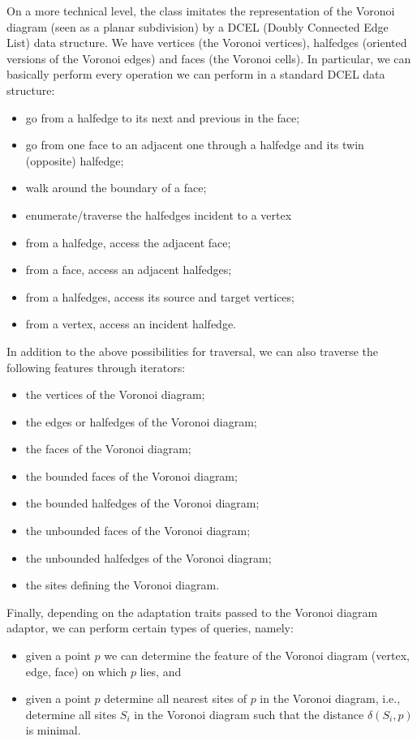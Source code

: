 On a more technical level, the 
class imitates the representation of the Voronoi diagram (seen as a
planar subdivision) by a DCEL (Doubly Connected Edge List) data
structure. We have vertices (the Voronoi vertices), halfedges
(oriented versions of the Voronoi edges) and faces (the Voronoi
cells). In particular, we can basically perform every operation we can
perform in a standard DCEL data structure:
\begin{itemize}
\item go from a halfedge to its next and previous in the face;
\item go from one face to an adjacent one through a halfedge and its
  twin (opposite) halfedge;
\item walk around the boundary of a face;
\item enumerate/traverse the halfedges incident to a vertex
\item from a halfedge, access the adjacent face;
\item from a face, access an adjacent halfedges;
\item from a halfedges, access its source and target vertices;
\item from a vertex, access an incident halfedge.
\end{itemize}
In addition to the above possibilities for traversal, we can also
traverse the following features through iterators:
\begin{itemize}
\item the vertices of the Voronoi diagram;
\item the edges or halfedges of the Voronoi diagram;
\item the faces of the Voronoi diagram;
\item the bounded faces of the Voronoi diagram;
\item the bounded halfedges of the Voronoi diagram;
\item the unbounded faces of the Voronoi diagram;
\item the unbounded halfedges of the Voronoi diagram;
\item the sites defining the Voronoi diagram.
\end{itemize}

Finally, depending on the adaptation traits passed to the Voronoi diagram
adaptor, we can perform certain types of queries, namely:
\begin{itemize}
\item given a point $p$ we can determine the feature of the Voronoi
  diagram (vertex, edge, face) on which $p$ lies, and
\item given a point $p$ determine all nearest sites of $p$ in the
  Voronoi diagram, i.e., determine all sites $S_i$ in the Voronoi
  diagram such that the distance $\delta(S_i,p)$ is minimal.
\end{itemize}

